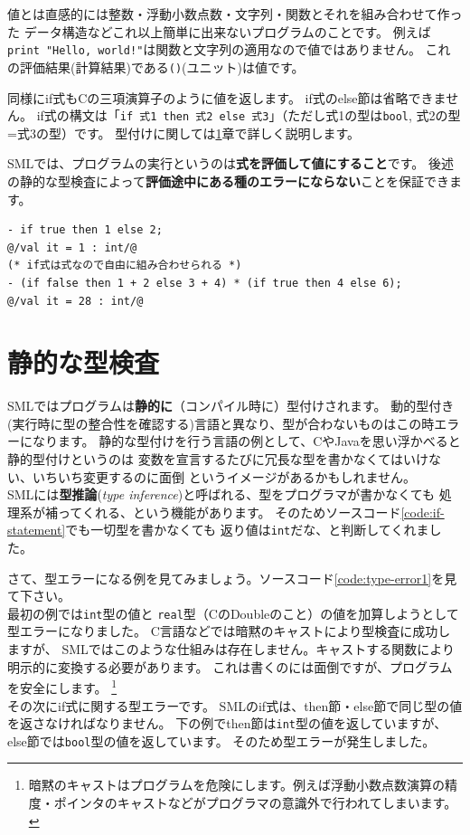 \documentclass[11pt,a4paper]{article}
\begin{document}
値とは直感的には整数・浮動小数点数・文字列・関数とそれを組み合わせて作った
データ構造などこれ以上簡単に出来ないプログラムのことです。
例えば\lstinline{print "Hello, world!"}は関数と文字列の適用なので値ではありません。
これの評価結果(計算結果)である\lstinline{()}(ユニット)は値です。

同様にif式もCの三項演算子のように値を返します。
if式のelse節は省略できません。
if式の構文は「\lstinline{if 式1 then 式2 else 式3}」（ただし式1の型は\lstinline{bool}, 式2の型=式3の型）です。
型付けに関しては\ref{sec:static-typing}章で詳しく説明します。

SMLでは、プログラムの実行というのは{\bfseries 式を評価して値にすること}です。
後述の静的な型検査によって{\bfseries 評価途中にある種のエラーにならない}ことを保証できます。

\begin{lstlisting}[caption=if文は式,label=code:if-statement]
- if true then 1 else 2;
@/val it = 1 : int/@
(* if式は式なので自由に組み合わせられる *)
- (if false then 1 + 2 else 3 + 4) * (if true then 4 else 6);
@/val it = 28 : int/@
\end{lstlisting}

\section{静的な型検査}
\label{sec:static-typing}

SMLではプログラムは{\bfseries 静的に}（コンパイル時に）型付けされます。
動的型付き(実行時に型の整合性を確認する)言語と異なり、型が合わないものはこの時エラーになります。
静的な型付けを行う言語の例として、CやJavaを思い浮かべると静的型付けというのは
変数を宣言するたびに冗長な型を書かなくてはいけない、いちいち変更するのに面倒
というイメージがあるかもしれません。\\
SMLには{\bfseries 型推論}({\itshape type inference})と呼ばれる、型をプログラマが書かなくても
処理系が補ってくれる、という機能があります。
そのためソースコード\ref{code:if-statement}でも一切型を書かなくても
返り値は\lstinline{int}だな、と判断してくれました。

さて、型エラーになる例を見てみましょう。ソースコード\ref{code:type-error1}を見て下さい。\\
最初の例では\lstinline{int}型の値と
\lstinline{real}型（CのDoubleのこと）の値を加算しようとして型エラーになりました。
C言語などでは暗黙のキャストにより型検査に成功しますが、
SMLではこのような仕組みは存在しません。キャストする関数により明示的に変換する必要があります。
これは書くのには面倒ですが、プログラムを安全にします。
\footnote{暗黙のキャストはプログラムを危険にします。例えば浮動小数点数演算の精度・ポインタのキャストなどがプログラマの意識外で行われてしまいます。}\\
その次にif式に関する型エラーです。
SMLのif式は、then節・else節で同じ型の値を返さなければなりません。
下の例でthen節は\lstinline{int}型の値を返していますが、else節では\lstinline{bool}型の値を返しています。
そのため型エラーが発生しました。
\end{document}
